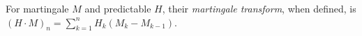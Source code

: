 
For martingale $M$ and predictable $H$, their \emph{martingale transform}, when defined, is $(H\cdot M)_n=\sum_{k=1}^nH_k(M_k-M_{k-1})$.
